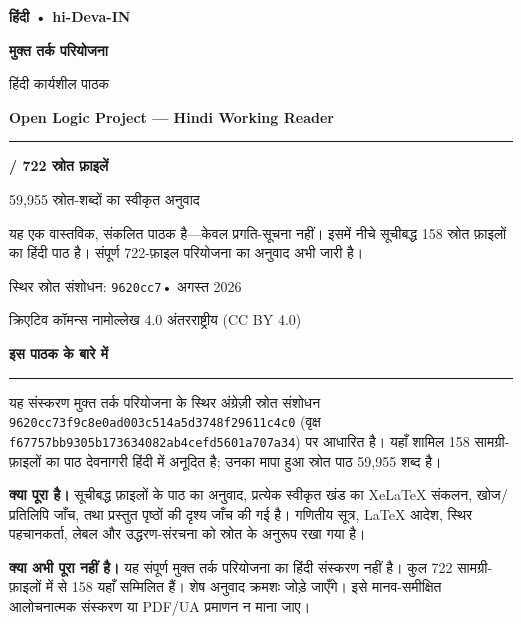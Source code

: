\documentclass[11pt]{article}
\newcommand{\ruleline}{\textcolor{accent}{\rule{\linewidth}{1.4pt}}}
\begin{document}
\pagecolor{soft}
\vspace*{16mm}
{\color{accent}\sffamily\bfseries\large हिंदी • hi-Deva-IN}\par
\vspace{7mm}
{\color{ink}\sffamily\bfseries\fontsize{30}{38}\selectfont
मुक्त तर्क परियोजना}\par
\vspace{2mm}
{\color{ink}\sffamily\fontsize{20}{26}\selectfont
हिंदी कार्यशील पाठक}\par
\vspace{6mm}
{\color{ink}\sffamily\bfseries\Large
\foreignlanguage{english}{Open Logic Project — Hindi Working Reader}}\par
\vspace{14mm}
\ruleline
\vspace{5mm}
{\sffamily\bfseries\fontsize{22}{28} / 722 स्रोत फ़ाइलें}\par
{\sffamily\large 59,955 स्रोत-शब्दों का स्वीकृत अनुवाद}\par
\vfill
\begin{minipage}{0.84\linewidth}
यह एक वास्तविक, संकलित पाठक है—केवल प्रगति-सूचना नहीं। इसमें नीचे सूचीबद्ध
158 स्रोत फ़ाइलों का हिंदी पाठ है। संपूर्ण 722-फ़ाइल परियोजना का अनुवाद अभी
जारी है।
\end{minipage}
\vfill
{\small\sffamily
स्थिर स्रोत संशोधन: \texttt{9620cc7}\quad• अगस्त 2026\par
क्रिएटिव कॉमन्स नामोल्लेख 4.0 अंतरराष्ट्रीय (CC BY 4.0)}
\clearpage
\pagecolor{white}

{\color{ink}\sffamily\bfseries\LARGE इस पाठक के बारे में}\par
\ruleline

यह संस्करण मुक्त तर्क परियोजना के स्थिर अंग्रेज़ी स्रोत संशोधन
\texttt{9620cc73f9c8e0ad003c514a5d3748f29611c4c0} (वृक्ष
\texttt{f67757bb9305b173634082ab4cefd5601a707a34}) पर आधारित है। यहाँ शामिल
158 सामग्री-फ़ाइलों का पाठ देवनागरी हिंदी में अनूदित है; उनका मापा हुआ स्रोत
पाठ 59,955 शब्द है।

\textbf{क्या पूरा है।} सूचीबद्ध फ़ाइलों के पाठ का अनुवाद, प्रत्येक स्वीकृत
खंड का XeLaTeX संकलन, खोज/प्रतिलिपि जाँच, तथा प्रस्तुत पृष्ठों की दृश्य जाँच
की गई है। गणितीय सूत्र, LaTeX आदेश, स्थिर पहचानकर्ता, लेबल और उद्धरण-संरचना
को स्रोत के अनुरूप रखा गया है।

\textbf{क्या अभी पूरा नहीं है।} यह संपूर्ण मुक्त तर्क परियोजना का हिंदी
संस्करण नहीं है। कुल 722 सामग्री-फ़ाइलों में से 158 यहाँ सम्मिलित हैं। शेष
अनुवाद क्रमशः जोड़े जाएँगे। इसे मानव-समीक्षित आलोचनात्मक संस्करण या PDF/UA
प्रमाणन न माना जाए।
\end{document}
